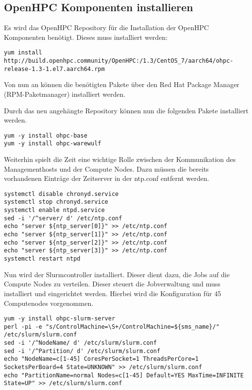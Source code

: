 \subsection{OpenHPC Komponenten installieren}
Es wird das OpenHPC Repository für die Installation der OpenHPC Komponenten benötigt. Dieses muss installiert werden:

\begin{lstlisting}
yum install http://build.openhpc.community/OpenHPC:/1.3/CentOS_7/aarch64/ohpc-release-1.3-1.el7.aarch64.rpm
\end{lstlisting}

Von nun an können die benötigten Pakete über den Red Hat Package Manager (RPM-Paketmanager) installiert werden.

Durch das neu angehängte Repository können nun die folgenden Pakete installiert werden.

\begin{lstlisting}
yum -y install ohpc-base
yum -y install ohpc-warewulf
\end{lstlisting}

Weiterhin spielt die Zeit eine wichtige Rolle zwischen der Kommunikation des Managementhosts und der Compute Nodes. Dazu müssen die bereits vorhandenen Einträge der Zeitserver in der ntp.conf entfernt werden.


\begin{lstlisting}
systemctl disable chronyd.service
systemctl stop chronyd.service
systemctl enable ntpd.service
sed -i '/^server/ d' /etc/ntp.conf
echo "server ${ntp_server[0]}" >> /etc/ntp.conf
echo "server ${ntp_server[1]}" >> /etc/ntp.conf
echo "server ${ntp_server[2]}" >> /etc/ntp.conf
echo "server ${ntp_server[3]}" >> /etc/ntp.conf
systemctl restart ntpd
\end{lstlisting}

Nun wird der Slurmcontroller installiert. Dieser dient dazu, die Jobs auf die Compute Nodes zu verteilen. Dieser steuert die Jobverwaltung und muss installiert und eingerichtet werden. Hierbei wird die Konfiguration für 45 Computenodes vorgenommen.

\begin{lstlisting}
yum -y install ohpc-slurm-server
perl -pi -e "s/ControlMachine=\S+/ControlMachine=${sms_name}/" /etc/slurm/slurm.conf
sed -i '/^NodeName/ d' /etc/slurm/slurm.conf
sed -i '/^Partition/ d' /etc/slurm/slurm.conf
echo "NodeName=c[1-45] CoresPerSocket=1 ThreadsPerCore=1 SocketsPerBoard=4 State=UNKNOWN" >> /etc/slurm/slurm.conf
echo "PartitionName=normal Nodes=c[1-45] Default=YES MaxTime=INFINITE State=UP" >> /etc/slurm/slurm.conf
\end{lstlisting}

